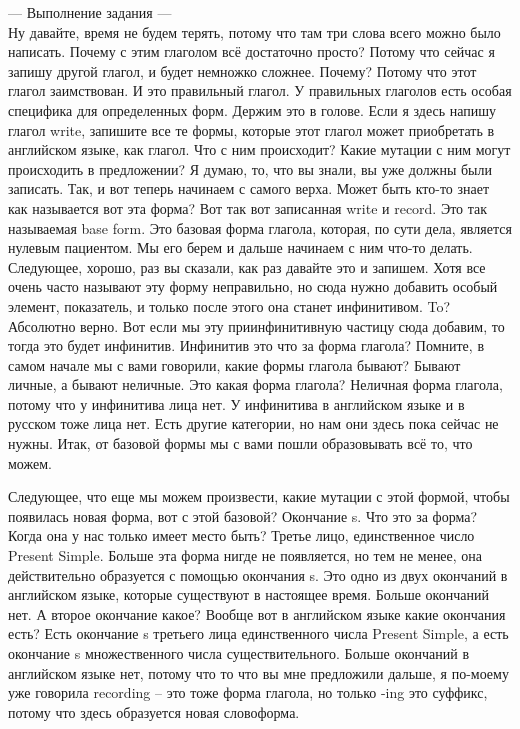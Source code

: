 \documentclass[main.tex]{subfiles}
\begin{document}
--- Выполнение задания ---
\\

Ну давайте, время не будем терять, потому что там три слова всего можно было написать.
Почему с этим глаголом всё достаточно просто?
Потому что сейчас я запишу другой глагол, и будет немножко сложнее.
Почему?
Потому что этот глагол заимствован.
И это правильный глагол.
У правильных глаголов есть особая специфика для определенных форм.
Держим это в голове.
Если я здесь напишу глагол write, запишите все те формы, которые этот глагол может приобретать в английском языке, как глагол.
Что с ним происходит?
Какие мутации с ним могут происходить в предложении?
Я думаю, то, что вы знали, вы уже должны были записать.
Так, и вот теперь начинаем с самого верха.
Может быть кто-то знает как называется вот эта форма?
Вот так вот записанная write и record.
Это так называемая base form.
Это базовая форма глагола, которая, по сути дела, является нулевым пациентом.
Мы его берем и дальше начинаем с ним что-то делать.
Следующее, хорошо, раз вы сказали, как раз давайте это и запишем.
Хотя все очень часто называют эту форму неправильно, но сюда нужно добавить особый элемент, показатель, и только после этого она станет инфинитивом.
To?
Абсолютно верно.
Вот если мы эту приинфинитивную частицу сюда добавим, то тогда это будет инфинитив.
Инфинитив это что за форма глагола?
Помните, в самом начале мы с вами говорили, какие формы глагола бывают?
Бывают личные, а бывают неличные.
Это какая форма глагола?
Неличная форма глагола, потому что у инфинитива лица нет.
У инфинитива в английском языке и в русском тоже лица нет.
Есть другие категории, но нам они здесь пока сейчас не нужны.
Итак, от базовой формы мы с вами пошли образовывать всё то, что можем.

Следующее, что еще мы можем произвести, какие мутации с этой формой, чтобы появилась новая форма, вот с этой базовой?
Окончание s.
Что это за форма?
Когда она у нас только имеет место быть?
Третье лицо, единственное число Present Simple.
Больше эта форма нигде не появляется, но тем не менее, она действительно образуется с помощью окончания s.
Это одно из двух окончаний в английском языке, которые существуют в настоящее время.
Больше окончаний нет.
А второе окончание какое?
Вообще вот в английском языке какие окончания есть?
Есть окончание s третьего лица единственного числа Present Simple, а есть окончание s множественного числа существительного.
Больше окончаний в английском языке нет, потому что то что вы мне предложили дальше, я по-моему уже говорила recording -- это тоже форма глагола, но только -ing это суффикс, потому что здесь образуется новая словоформа.
\end{document}
